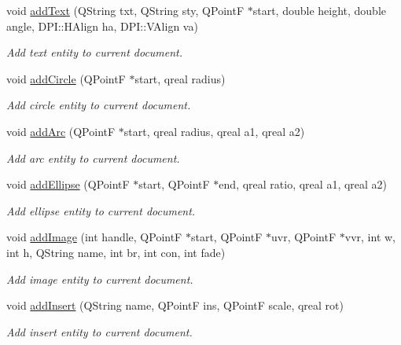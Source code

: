 \begin{DoxyCompactItemize}
\item 
void \hyperlink{classDoc__plugin__interface_aa77a84d221543bed5b6ac267bd630132}{add\-Text} (Q\-String txt, Q\-String sty, Q\-Point\-F $\ast$start, double height, double angle, D\-P\-I\-::\-H\-Align ha, D\-P\-I\-::\-V\-Align va)
\begin{DoxyCompactList}\small\item\em Add text entity to current document. \end{DoxyCompactList}\item 
void \hyperlink{classDoc__plugin__interface_a408af40d5fa87c206cf45baeccf4dd61}{add\-Circle} (Q\-Point\-F $\ast$start, qreal radius)
\begin{DoxyCompactList}\small\item\em Add circle entity to current document. \end{DoxyCompactList}\item 
void \hyperlink{classDoc__plugin__interface_ac0fa12a9a618986941c753924b39c762}{add\-Arc} (Q\-Point\-F $\ast$start, qreal radius, qreal a1, qreal a2)
\begin{DoxyCompactList}\small\item\em Add arc entity to current document. \end{DoxyCompactList}\item 
void \hyperlink{classDoc__plugin__interface_a0c421b7399ac65260c034af6452105f7}{add\-Ellipse} (Q\-Point\-F $\ast$start, Q\-Point\-F $\ast$end, qreal ratio, qreal a1, qreal a2)
\begin{DoxyCompactList}\small\item\em Add ellipse entity to current document. \end{DoxyCompactList}\item 
void \hyperlink{classDoc__plugin__interface_ada8b3022eaeaf0d7481aa46267fec165}{add\-Image} (int handle, Q\-Point\-F $\ast$start, Q\-Point\-F $\ast$uvr, Q\-Point\-F $\ast$vvr, int w, int h, Q\-String name, int br, int con, int fade)
\begin{DoxyCompactList}\small\item\em Add image entity to current document. \end{DoxyCompactList}\item 
void \hyperlink{classDoc__plugin__interface_a3fd497543d79a27de42503b97a013839}{add\-Insert} (Q\-String name, Q\-Point\-F ins, Q\-Point\-F scale, qreal rot)
\begin{DoxyCompactList}\small\item\em Add insert entity to current document. \end{DoxyCompactList}\item 

\end{DoxyCompactItemize}
